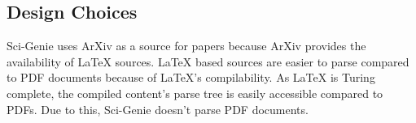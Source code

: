 \subsection{Design Choices}
Sci-Genie uses ArXiv as a source for papers because ArXiv provides the availability of LaTeX sources. LaTeX based sources are easier to parse compared to PDF documents because of LaTeX's compilability. As LaTeX is Turing complete, the compiled content’s parse tree is easily accessible compared to PDFs. Due to this, Sci-Genie doesn't parse PDF documents. 